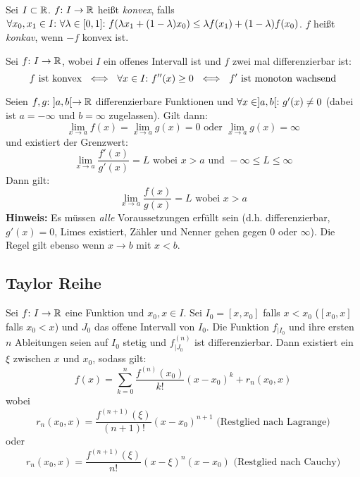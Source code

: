 \begin{frameddefn}
	Sei $I \subset \mathbb{R}$. $f{:}\  I \to \mathbb{R}$ heißt \textit{konvex}, falls $\forall x_0, x_1 \in I{:}\  \forall \lambda \in [0,1]{:}\  f(\lambda x_1 + (1-\lambda) x_0) \leq \lambda f(x_1) + (1-\lambda) f(x_0)$. $f$ heißt \textit{konkav}, wenn $-f$ konvex ist.
\end{frameddefn}

\begin{framedthm}
	Sei $f{:}\  I \to \mathbb{R}$, wobei $I$ ein offenes Intervall ist und $f$ zwei mal differenzierbar ist:
	\[
	f \textrm{ ist konvex } \iff\  \forall x \in I{:}\  f''(x) \geq 0 \ \iff\ f' \textrm{ ist monoton wachsend}
	\]
\end{framedthm}

\begin{framedthm}
	Seien $f,g {:}\  ]a,b[ \to \mathbb{R}$ differenzierbare Funktionen und $\forall x \in ]a,b[{:}\  g'(x) \neq 0$ (dabei ist $a=-\infty$ und $b=\infty$ zugelassen). Gilt dann:
	\[
	\lim\limits_{x \to a} f(x) = \lim\limits_{x \to a} g(x) = 0 \textrm{ oder } \lim\limits_{x \to a} g(x) = \infty
	\]
	und existiert der Grenzwert:
	\[
	\lim\limits_{x \to a} \frac{f'(x)}{g'(x)} = L \textrm{ wobei } x > a \textrm{ und } -\infty\leq L \leq \infty
	\]
	Dann gilt:
	\[
	\lim\limits_{x \to a} \frac{f(x)}{g(x)} = L \textrm{ wobei } x > a
	\]
	\textbf{Hinweis:} Es müssen \textit{alle} Voraussetzungen erfüllt sein (d.h. differenzierbar, $g'(x) = 0$, Limes existiert, Zähler und Nenner gehen gegen $0$ oder $\infty$). Die Regel gilt ebenso wenn $x \to b$ mit $x < b$.
\end{framedthm}

\newpage
\subsection{Taylor Reihe}

\begin{framedthm}
	Sei $f{:}\  I \to \mathbb{R}$ eine Funktion und $x_0, x \in I$. Sei $I_0 = [x, x_0]$ falls $x < x_0$ ($[x_0, x]$ falls $x_0 < x$) und $J_0$ das offene Intervall von $I_0$. Die Funktion $f_{|I_{0}}$ und ihre ersten $n$ Ableitungen seien auf $I_0$ stetig und $f^{(n)}_{|J_{0}}$ ist differenzierbar. Dann existiert ein $\xi$ zwischen $x$ und $x_0$, sodass gilt:
	\[
	f(x) = \sum^{n}_{k=0} \frac{f^{(n)}(x_0)}{k!} (x-x_0)^k + r_n(x_0, x)
	\]
	wobei
	\[
	r_n(x_0,x) = \frac{f^{(n+1)}(\xi)}{(n+1)!} (x-x_0)^{n+1} \textrm{ (Restglied nach Lagrange)}
	\]
	oder
	\[
	r_n(x_0,x) = \frac{f^{(n+1)}(\xi)}{n!} (x-\xi)^{n} (x-x_0) \textrm{ (Restglied nach Cauchy)}
	\]
\end{framedthm}

